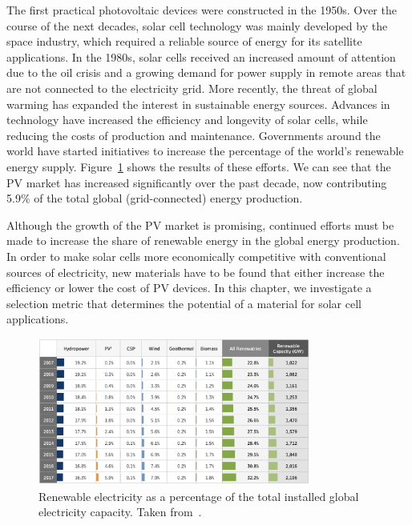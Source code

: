 \begin{refsection}
The first practical photovoltaic devices were constructed in the 1950s. Over 
the course of the next decades, solar cell technology was mainly developed by 
the space industry, which required a reliable source of energy for its 
satellite applications. In the 1980s, solar cells received an increased amount 
of attention due to the oil crisis and a growing demand for power supply in 
remote areas that are not connected to the electricity grid. More recently, 
the threat of global warming has expanded the interest in sustainable energy 
sources. Advances in technology have increased the efficiency and longevity of 
solar cells, while reducing the costs of production and maintenance. 
Governments around the world have started initiatives to increase the 
percentage of the world's renewable energy supply. 
Figure~\ref{fig:slme-pv_evo} shows the results of these efforts. We can see 
that the PV market has increased significantly over the past decade, now 
contributing 5.9\% of the total global (grid-connected) energy production. 
 
Although the growth of the PV market is promising, continued efforts must be 
made to increase the share of renewable energy in the global energy 
production. In order to make solar cells more economically competitive with 
conventional sources of electricity, new materials have to be found that 
either increase the efficiency or lower the cost of PV devices. In this 
chapter, we investigate a selection metric that determines the potential of a 
material for solar cell applications. 
 
\begin{figure}[!htp]  
\centering 
\includegraphics[width=0.8\textwidth]{./Figures/slme/pv-evo.png} 
\caption{Renewable electricity as a percentage of the total installed global 
electricity capacity. Taken from~\cite{NREL2017}.} 
\label{fig:slme-pv_evo}  
\end{figure} 
 

\end{refsection}

